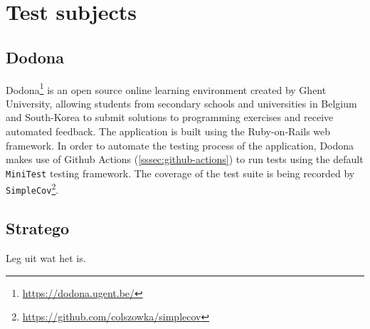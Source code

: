 
\section{Test subjects}

\subsection{Dodona}
Dodona\footnote{\url{https://dodona.ugent.be/}} is an open source online learning environment created by Ghent University, allowing students from secondary schools and universities in Belgium and South-Korea to submit solutions to programming exercises and receive automated feedback. The application is built using the Ruby-on-Rails web framework. In order to automate the testing process of the application, Dodona makes use of Github Actions (\autoref{sssec:github-actions}) to run tests using the default \texttt{MiniTest} testing framework. The coverage of the test suite is being recorded by \texttt{SimpleCov}\footnote{\url{https://github.com/colszowka/simplecov}}.

\subsection{Stratego}
Leg uit wat het is.